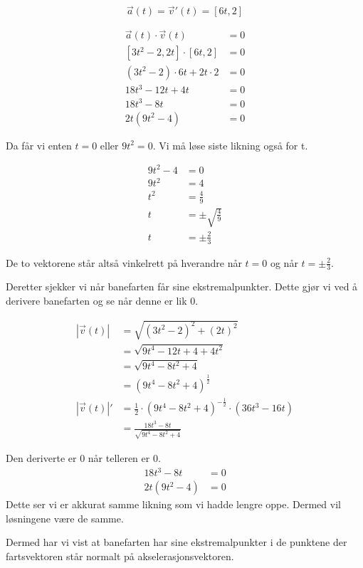 \begin{easylist}[enumerate]
		$$\vec{a}(t)  = \vec{v}'(t)  = [6t,2] $$
		
		\begin{align*}
				\vec{a}(t) \cdot \vec{v}(t) &= 0 \\
				[3t^2 -2,2t] \cdot [6t,2] & = 0 \\
				(3t^2 - 2) \cdot 6t + 2t \cdot 2  & = 0\\
				18t^3 - 12t + 4t & = 0 \\
				18t^3 - 8t & = 0 \\
				2t(9t^2 -4) & = 0 
		\end{align*}
		
		Da får vi enten $t = 0$ eller $9t^2 = 0$. Vi må løse siste likning også for t.
		
		\begin{align*}
				9t^2 -4 & = 0 \\
				9t^2 & = 4 \\
				t^2 & = \frac{4}{9}\\
				t &= \pm \sqrt{\frac{4}{9}} \\
				t &= \pm \frac{2}{3}
		\end{align*}
		
		De to vektorene står altså vinkelrett på hverandre når $t = 0$ og når $t = \pm \frac{2}{3}$.
		
		Deretter sjekker vi når banefarten får sine ekstremalpunkter. Dette gjør vi ved å derivere banefarten og se når denne er lik 0.
		
		\begin{align*}
	|\vec{v}(t)| & = \sqrt{(3t^2 - 2)^2 + (2t)^2} \\
				 & = \sqrt{9t^4 - 12t + 4 +4t^2} \\
				 & = \sqrt{9t^4 - 8t^2 + 4}\\
				 & = (9t^4 - 8t^2 + 4)^{\frac{1}{2}} \\
|\vec{v}(t)| '   &= \frac{1}{2} \cdot (9t^4 - 8t^2 + 4)^{-\frac{1}{2}} \cdot (36t^3 -16t) \\
				 & = \frac{18t^3 - 8t}{\sqrt{9t^4 - 8t^2 + 4}} 
		\end{align*}
		
		Den deriverte er 0 når telleren er 0.
		\begin{align*}
				18t^3 - 8t & = 0 \\
				2t(9t^2 -4) & = 0 
		\end{align*}
		Dette ser vi er akkurat samme likning som vi hadde lengre oppe. Dermed vil løsningene være de samme. 
		
		Dermed har vi vist at banefarten har sine ekstremalpunkter i de punktene der fartsvektoren står normalt på akselerasjonsvektoren.
\end{easylist}



